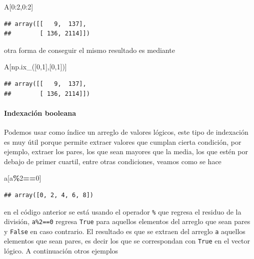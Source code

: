\documentclass[
]{book}
\newenvironment{Shaded}{\begin{snugshade}}{\end{snugshade}}
\newcommand{\DecValTok}[1]{\textcolor[rgb]{0.00,0.00,0.81}{#1}}
\newcommand{\NormalTok}[1]{#1}
\newcommand{\OperatorTok}[1]{\textcolor[rgb]{0.81,0.36,0.00}{\textbf{#1}}}
\theoremstyle{definition}
\theoremstyle{definition}
\theoremstyle{definition}
\theoremstyle{definition}
\theoremstyle{remark}
\begin{document}
\begin{Shaded}
\begin{Highlighting}[]
\NormalTok{A[}\DecValTok{0}\NormalTok{:}\DecValTok{2}\NormalTok{,}\DecValTok{0}\NormalTok{:}\DecValTok{2}\NormalTok{] }
\end{Highlighting}
\end{Shaded}

\begin{verbatim}
## array([[   9,  137],
##        [ 136, 2114]])
\end{verbatim}

otra forma de conseguir el mismo resultado es mediante

\begin{Shaded}
\begin{Highlighting}[]
\NormalTok{A[np.ix\_([}\DecValTok{0}\NormalTok{,}\DecValTok{1}\NormalTok{],[}\DecValTok{0}\NormalTok{,}\DecValTok{1}\NormalTok{])]}
\end{Highlighting}
\end{Shaded}

\begin{verbatim}
## array([[   9,  137],
##        [ 136, 2114]])
\end{verbatim}

\hypertarget{IndexacionBooleana}{%
\paragraph{Indexación booleana}\label{IndexacionBooleana}}

Podemos usar como índice un arreglo de valores lógicos, este tipo de indexación es muy útil porque permite extraer valores que cumplan cierta condición, por ejemplo, extraer los pares, los que sean mayores que la media, los que estén por debajo de primer cuartil, entre otras condiciones, veamos como se hace

\begin{Shaded}
\begin{Highlighting}[]
\NormalTok{a[a}\OperatorTok{\%}\DecValTok{2}\OperatorTok{==}\DecValTok{0}\NormalTok{] }
\end{Highlighting}
\end{Shaded}

\begin{verbatim}
## array([0, 2, 4, 6, 8])
\end{verbatim}

en el código anterior se está usando el operador \texttt{\%} que regresa el residuo de la división, \texttt{a\%2==0} regresa \texttt{True} para aquellos elementos del arreglo que sean pares y \texttt{False} en caso contrario. El resultado es que se extraen del arreglo \texttt{a} aquellos elementos que sean pares, es decir los que se correspondan con \texttt{True} en el vector lógico. A continuación otros ejemplos
\end{document}

